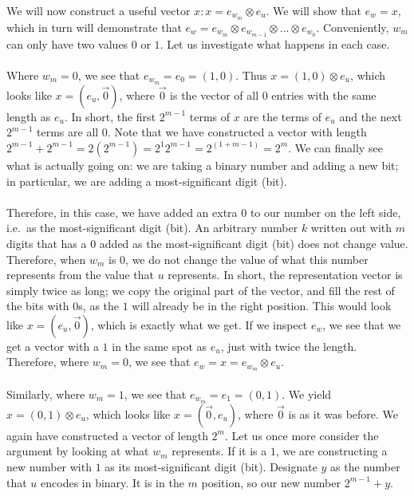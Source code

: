 \documentclass[letterpaper]{article}
\begin{document}
We will now construct a useful vector $ x : x = e_{w_m} \otimes e_u $.
We will show that $ e_w = x $, which in turn will demonstrate that $ e_w = e_{w_m} \otimes e_{w_{m-1}} \otimes \ldots \otimes e_{w_{0}} $.
Conveniently, $ w_m $ can only have two values $ 0 $ or $ 1 $.
Let us investigate what happens in each case.
\\ \\
Where $ w_m = 0 $, we see that $ e_{w_m} = e_0 = (1,0) $.
Thus $ x = (1,0) \otimes e_u $, which looks like $ x = (e_u, \vec{0}) $, where $ \vec{0} $ is the vector of all $ 0 $ entries with the same length as $ e_u $.
In short, the first $ 2^{m-1} $ terms of $ x $ are the terms of $ e_u $ and the next $ 2^{m-1} $ terms are all $ 0 $.
Note that we have constructed a vector with length $ 2^{m-1} + 2^{m-1} = 2(2^{m-1}) = 2^1 2^{m-1} = 2^{(1 + m - 1)} = 2^m $.
We can finally see what is actually going on:
we are taking a binary number and adding a new bit; in particular, we are adding a most-significant digit (bit).
\\ \\
Therefore, in this case, we have added an extra $ 0 $ to our number on the left side, i.e.\ as the most-significant digit (bit).
An arbitrary number $ k $ written out with $ m $ digits that has a $ 0 $ added as the most-significant digit (bit) does not change value.
Therefore, when $ w_m $ is $ 0 $, we do not change the value of what this number represents from the value that $ u $ represents.
In short, the representation vector is simply twice as long; we copy the original part of the vector, and fill the rest of the bits with $ 0 $s, as the $ 1 $ will already be in the right position.
This would look like $ x = (e_u, \vec{0}) $, which is exactly what we get.
If we inspect $ e_w $, we see that we get a vector with a $ 1 $ in the same spot as $ e_u $, just with twice the length.
Therefore, where $ w_m = 0 $, we see that $ e_w = x = e_{w_m} \otimes e_u $.
\\ \\
Similarly, where $ w_m = 1 $, we see that $ e_{w_m} = e_1 = (0,1) $.
We yield $ x = (0,1) \otimes e_u $, which looks like $ x = (\vec{0}, e_u) $, where $ \vec{0} $ is as it was before.
We again have constructed a vector of length $ 2^m $.
Let us once more consider the argument by looking at what $ w_m $ represents.
If it is a $ 1 $, we are constructing a new number with $ 1 $ as its most-significant digit (bit).
Designate $ y $ as the number that $ u $ encodes in binary.
It is in the $ m $ position, so our new number $ 2^{m - 1} + y $.
\end{document}
